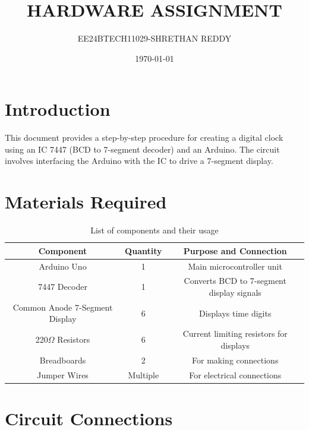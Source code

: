 \documentclass[journal]{IEEEtran}
\title{HARDWARE ASSIGNMENT}
\author{EE24BTECH11029-SHRETHAN REDDY}
\date{\today}
\numberwithin{equation}{enumi}
\numberwithin{figure}{enumi}
\begin{document}
\maketitle

\tableofcontents
\newpage

\section{Introduction}
This document provides a step-by-step procedure for creating a digital clock using an IC 7447 (BCD to 7-segment decoder) and an Arduino. The circuit involves interfacing the Arduino with the IC to drive a 7-segment display.
\section{Materials Required}
\begin{table}[h]
    \centering
    \begin{tabular}{|c|c|c|}
        \hline
        \textbf{Component} & \textbf{Quantity} & \textbf{Purpose and Connection} \\
        \hline
        Arduino Uno & 1 & Main microcontroller unit \\
        7447 Decoder & 1 & Converts BCD to 7-segment display signals \\
        Common Anode 7-Segment Display & 6 & Displays time digits \\
        220$\Omega$ Resistors & 6 & Current limiting resistors for displays \\
        Breadboards & 2 & For making connections \\
        Jumper Wires & Multiple & For electrical connections \\
        \hline
    \end{tabular}
    \caption{List of components and their usage}
    \label{tab:components}
\end{table}
\section{Circuit Connections}
\end{document}
